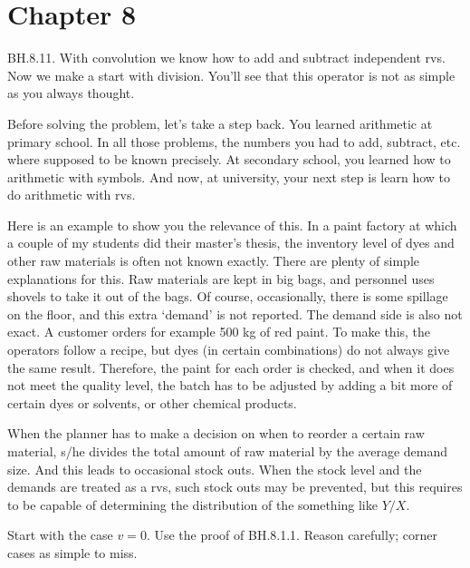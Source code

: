 

\chapter{Chapter 8}


\setcounter{theorem}{10}
\begin{exercise} BH.8.11. With convolution we know how to  add and subtract independent rvs. Now we make a start with division. You'll see that this operator is not as simple as you always thought.

Before solving the problem, let's take a step back.
You learned arithmetic at primary school.
In all those problems, the numbers you had to add, subtract, etc.
where supposed to be known precisely.
At secondary school, you learned how to arithmetic with symbols.
And now, at university, your next step is learn how to do arithmetic with rvs.

Here is an example to show you the relevance of this.
In a paint factory at which a couple of my students did their master's thesis, the inventory level of dyes and other raw materials is often not known exactly.
There are plenty of simple explanations for this.
Raw materials are kept in big bags, and personnel uses shovels to take it out of the bags.
Of course, occasionally, there is some spillage on the floor, and this extra `demand' is not reported.
The demand side is also not exact.
A customer orders for example 500 kg of red paint.
To make this, the operators follow a recipe, but dyes (in certain combinations) do not always give the same  result. Therefore, the paint for each order is checked, and when it does not meet the quality level, the batch has to be adjusted by adding a bit more of certain dyes or solvents, or other chemical products.

When the planner has to make a decision on when to reorder a certain raw material, s/he divides the total amount of raw material by the average demand size. And this leads to occasional stock outs. When the stock level and the demands are treated as a rvs, such stock outs may be prevented, but this requires to be capable of determining the distribution of the something like $Y/X$.

\begin{hint}
Start with the case $v=0$. Use the proof of BH.8.1.1. Reason carefully; corner cases as simple to miss.


\end{hint}
\end{exercise}
